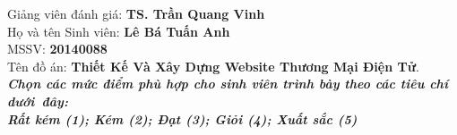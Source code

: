 \thispagestyle{plain}
\begin{center}
\Large{}
\end{center}
Giảng viên đánh giá:\hspace{3cm} \textbf{TS. Trần Quang Vinh} \\
Họ và tên Sinh viên:\hspace{3.33cm} \textbf{Lê Bá Tuấn Anh}\\
MSSV:\hspace{6.7cm} \textbf{20140088}\\
Tên đồ án:     \textbf {Thiết Kế Và Xây Dựng Website Thương Mại Điện Tử}.\\
\emph{\textbf{Chọn các mức điểm phù hợp cho sinh viên trình bày theo các tiêu chí dưới~đây:\\
Rất kém (1); Kém (2); Đạt (3); Giỏi (4); Xuất sắc (5)}} \\
